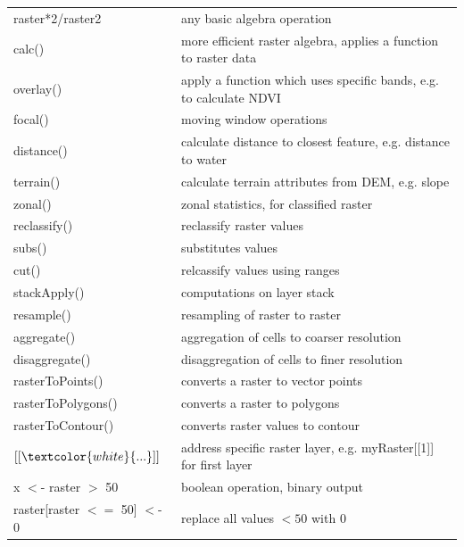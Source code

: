 \documentclass[10pt,landscape]{article}
\begin{document}
\begin{multicols}{3}
\begin{tabular}{@{}p{\the\MyLen}%
                @{}p{\linewidth-\the\MyLen}@{}}
raster*2/raster2 & any basic algebra operation \\                
calc()  	& more efficient raster algebra, applies a function to raster data \\
overlay()       & apply a function which uses specific bands, e.g. to calculate NDVI\\
focal()         & moving window operations \\
distance()      & calculate distance to closest feature, e.g. distance to water\\
terrain() 	& calculate terrain attributes from DEM, e.g. slope \\
zonal()         & zonal statistics, for classified raster\\
reclassify()	& reclassify raster values \\
subs()		& substitutes values \\
cut()		& relcassify values using ranges\\
stackApply()	& computations on layer stack\\
resample() 	& resampling of raster to raster \\
aggregate()	& aggregation of cells to coarser resolution\\
disaggregate()	& disaggregation of cells to finer resolution\\
rasterToPoints() & converts a raster to vector points	\\
rasterToPolygons() & converts a raster to polygons \\
rasterToContour()  & converts raster values to contour \\
$[[\textcolor{white}{...}]]$		& address specific raster layer, e.g. myRaster[[1]] for first layer    \\  
x $<$- raster $>$ 50	& boolean operation, binary output \\
raster[raster $<=$ 50] $<$- 0 & replace all values $< 50$ with 0 \\


\end{tabular}
  


\end{multicols}
\end{document}
